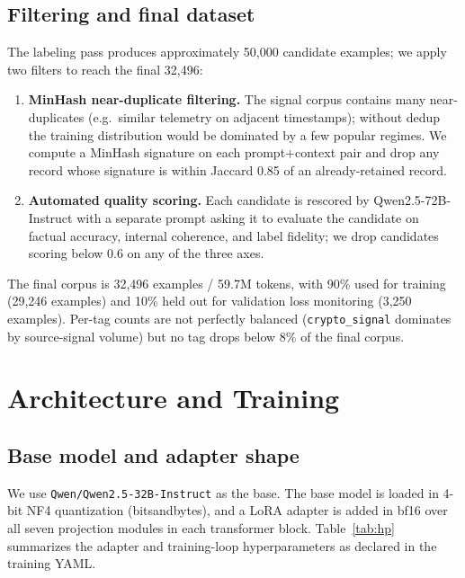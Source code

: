 \documentclass[10pt,letterpaper]{article}
\begin{document}
\subsection{Filtering and final dataset}

The labeling pass produces approximately 50{,}000 candidate examples; we apply two filters to reach the final 32{,}496:

\begin{enumerate}[leftmargin=*,itemsep=0pt]
\item \textbf{MinHash near-duplicate filtering.} The signal corpus contains many near-duplicates (e.g.\ similar telemetry on adjacent timestamps); without dedup the training distribution would be dominated by a few popular regimes. We compute a MinHash signature on each prompt+context pair and drop any record whose signature is within Jaccard 0.85 of an already-retained record.
\item \textbf{Automated quality scoring.} Each candidate is rescored by Qwen2.5-72B-Instruct with a separate prompt asking it to evaluate the candidate on factual accuracy, internal coherence, and label fidelity; we drop candidates scoring below 0.6 on any of the three axes.
\end{enumerate}

The final corpus is 32{,}496 examples / 59.7M tokens, with 90\% used for training (29{,}246 examples) and 10\% held out for validation loss monitoring (3{,}250 examples). Per-tag counts are not perfectly balanced (\texttt{crypto\_signal} dominates by source-signal volume) but no tag drops below 8\% of the final corpus.

\section{Architecture and Training}
\label{sec:training}

\subsection{Base model and adapter shape}

We use \texttt{Qwen/Qwen2.5-32B-Instruct} as the base. The base model is loaded in 4-bit NF4 quantization (bitsandbytes), and a LoRA adapter is added in bf16 over all seven projection modules in each transformer block. Table~\ref{tab:hp} summarizes the adapter and training-loop hyperparameters as declared in the training YAML.
\end{document}

